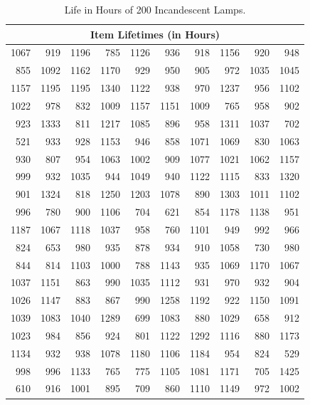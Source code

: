 \begin{table}[h!]
\centering
\small %
\renewcommand{\arraystretch}{1.2}
{
\begin{tabular}{rrrrrrrrrr}
\toprule
\multicolumn{10}{c}{\textbf{Item Lifetimes (in Hours)}} \\
\midrule
1067 & 919 & 1196 & 785 & 1126 & 936 & 918 & 1156 & 920 & 948 \\
855 & 1092 & 1162 & 1170 & 929 & 950 & 905 & 972 & 1035 & 1045 \\
1157 & 1195 & 1195 & 1340 & 1122 & 938 & 970 & 1237 & 956 & 1102 \\
1022 & 978 & 832 & 1009 & 1157 & 1151 & 1009 & 765 & 958 & 902 \\
923 & 1333 & 811 & 1217 & 1085 & 896 & 958 & 1311 & 1037 & 702 \\
521 & 933 & 928 & 1153 & 946 & 858 & 1071 & 1069 & 830 & 1063 \\
930 & 807 & 954 & 1063 & 1002 & 909 & 1077 & 1021 & 1062 & 1157 \\
999 & 932 & 1035 & 944 & 1049 & 940 & 1122 & 1115 & 833 & 1320 \\
901 & 1324 & 818 & 1250 & 1203 & 1078 & 890 & 1303 & 1011 & 1102 \\
996 & 780 & 900 & 1106 & 704 & 621 & 854 & 1178 & 1138 & 951 \\
1187 & 1067 & 1118 & 1037 & 958 & 760 & 1101 & 949 & 992 & 966 \\
824 & 653 & 980 & 935 & 878 & 934 & 910 & 1058 & 730 & 980 \\
844 & 814 & 1103 & 1000 & 788 & 1143 & 935 & 1069 & 1170 & 1067 \\
1037 & 1151 & 863 & 990 & 1035 & 1112 & 931 & 970 & 932 & 904 \\
1026 & 1147 & 883 & 867 & 990 & 1258 & 1192 & 922 & 1150 & 1091 \\
1039 & 1083 & 1040 & 1289 & 699 & 1083 & 880 & 1029 & 658 & 912 \\
1023 & 984 & 856 & 924 & 801 & 1122 & 1292 & 1116 & 880 & 1173 \\
1134 & 932 & 938 & 1078 & 1180 & 1106 & 1184 & 954 & 824 & 529 \\
998 & 996 & 1133 & 765 & 775 & 1105 & 1081 & 1171 & 705 & 1425 \\
610 & 916 & 1001 & 895 & 709 & 860 & 1110 & 1149 & 972 & 1002 \\
\bottomrule
\end{tabular}
}
\caption{Life in Hours of 200 Incandescent Lamps.}
\label{tab:lamp_life_raw}
\end{table}

